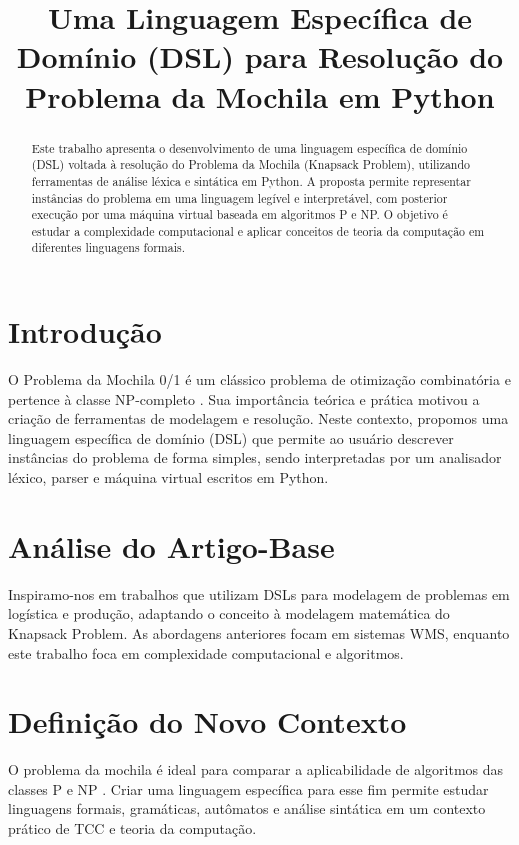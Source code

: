 \documentclass[conference]{IEEEtran}
\title{Uma Linguagem Específica de Domínio (DSL) para Resolução do Problema da Mochila em Python}
\author{
    \IEEEauthorblockN{Guilherme Cavenaghi - 109317,
    Rafael Godoy - 110453,
    Rafael Pereira de Souza - 109680}
    \IEEEauthorblockA{Centro Universitário FHO\\
    \{guilherme.cavenaghi, Rafagodoy330, rafael.souza\}@alunos.fho.edu.br}
}
\begin{document}
\maketitle

\begin{abstract}
Este trabalho apresenta o desenvolvimento de uma linguagem específica de domínio (DSL) voltada à resolução do Problema da Mochila (Knapsack Problem), utilizando ferramentas de análise léxica e sintática em Python. A proposta permite representar instâncias do problema em uma linguagem legível e interpretável, com posterior execução por uma máquina virtual baseada em algoritmos P e NP. O objetivo é estudar a complexidade computacional e aplicar conceitos de teoria da computação em diferentes linguagens formais.
\end{abstract}

\section{Introdução}
O Problema da Mochila 0/1 é um clássico problema de otimização combinatória e pertence à classe NP-completo \cite{martello1990knapsack}. Sua importância teórica e prática motivou a criação de ferramentas de modelagem e resolução. Neste contexto, propomos uma linguagem específica de domínio (DSL) que permite ao usuário descrever instâncias do problema de forma simples, sendo interpretadas por um analisador léxico, parser e máquina virtual escritos em Python.

\section{Análise do Artigo-Base}
Inspiramo-nos em trabalhos que utilizam DSLs para modelagem de problemas em logística e produção, adaptando o conceito à modelagem matemática do Knapsack Problem. As abordagens anteriores focam em sistemas WMS, enquanto este trabalho foca em complexidade computacional e algoritmos.

\section{Definição do Novo Contexto}
O problema da mochila é ideal para comparar a aplicabilidade de algoritmos das classes P e NP \cite{cormen2022algorithms}. Criar uma linguagem específica para esse fim permite estudar linguagens formais, gramáticas, autômatos e análise sintática em um contexto prático de TCC e teoria da computação.
\end{document}
